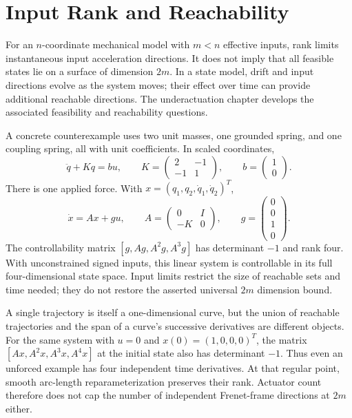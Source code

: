 \documentclass[12pt, openany]{book}
\theoremstyle{plain}
\begin{document}
\section{Input Rank and Reachability}

For an $n$-coordinate mechanical model with $m<n$ effective inputs, rank limits
instantaneous input acceleration directions. It does not imply that all feasible
states lie on a surface of dimension $2m$. In a state model, drift and input
directions evolve as the system moves; their effect over time can provide
additional reachable directions. The underactuation chapter develops the
associated feasibility and reachability questions.

A concrete counterexample uses two unit masses, one grounded spring, and one
coupling spring, all with unit coefficients. In scaled coordinates,
\begin{equation}
 \ddot q+Kq=bu,\qquad
 K=\begin{pmatrix}2&-1\\-1&1\end{pmatrix},\qquad
 b=\begin{pmatrix}1\\0\end{pmatrix}.
 \label{eq:motion_coupled_springs}
\end{equation}
There is one applied force. With $x=(q_1,q_2,\dot q_1,\dot q_2)^T$,
\begin{equation}
 \dot x=Ax+gu,\qquad
 A=\begin{pmatrix}0&I\\-K&0\end{pmatrix},\qquad
 g=\begin{pmatrix}0\\0\\1\\0\end{pmatrix}.
 \label{eq:motion_spring_state}
\end{equation}
The controllability matrix $[g,Ag,A^2g,A^3g]$ has determinant $-1$ and rank
four. With unconstrained signed inputs, this linear system is controllable in
its full four-dimensional state space. Input limits restrict the size of
reachable sets and time needed; they do not restore the asserted universal
$2m$ dimension bound.

A single trajectory is itself a one-dimensional curve, but the union of
reachable trajectories and the span of a curve's successive derivatives are
different objects. For the same system with $u=0$ and $x(0)=(1,0,0,0)^T$,
the matrix $[Ax,A^2x,A^3x,A^4x]$ at the initial state also has determinant
$-1$. Thus even an unforced example has four independent time derivatives.
At that regular point, smooth arc-length reparameterization preserves their
rank. Actuator count therefore does not cap the number of independent
Frenet-frame directions at $2m$ either.
\end{document}

